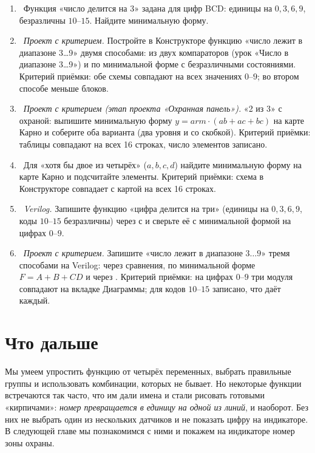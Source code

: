 \begin{taskbox}
\begin{enumerate}
  \item {}~Функция «число делится на 3» задана для цифр BCD: единицы на $0,3,6,9$, безразличны $10$--$15$. Найдите минимальную форму.
  \item {}~\emph{Проект с критерием.} Постройте в Конструкторе функцию «число лежит в диапазоне 3\ldots 9» двумя способами: из двух компараторов (урок «Число в диапазоне 3\ldots 9») и по минимальной форме с безразличными состояниями. Критерий приёмки: обе схемы совпадают на всех значениях $0$--$9$; во втором способе меньше блоков.
  \item {}~\emph{Проект с критерием (этап проекта «Охранная панель»).} «2 из 3» с охраной: выпишите минимальную форму $y=arm\cdot(ab+ac+bc)$ на карте Карно и соберите оба варианта (два уровня и со скобкой). Критерий приёмки: таблицы совпадают на всех 16 строках, число элементов записано.
  \item {}~Для «хотя бы двое из четырёх» ($a,b,c,d$) найдите минимальную форму на карте Карно и подсчитайте элементы. Критерий приёмки: схема в Конструкторе совпадает с картой на всех 16 строках.
  \item {}~\emph{Verilog.} Запишите функцию «цифра делится на три» (единицы на $0,3,6,9$, коды $10$--$15$ безразличны) через  с  и сверьте её с минимальной формой на цифрах $0$--$9$.
  \item {}~\emph{Проект с критерием.} Запишите «число лежит в диапазоне $3\ldots9$» тремя способами на Verilog: через сравнения, по минимальной форме $F=A+B+CD$ и через . Критерий приёмки: на цифрах $0$--$9$ три модуля совпадают на вкладке Диаграммы; для кодов $10$--$15$ записано, что даёт каждый.
\end{enumerate}
\end{taskbox}

\section{Что дальше}

Мы умеем упростить функцию от четырёх переменных, выбрать правильные группы
и использовать комбинации, которых не бывает. Но некоторые функции встречаются
так часто, что им дали имена и стали рисовать готовыми «кирпичами»:
\emph{номер превращается в единицу на одной из линий}, и наоборот. Без них
не выбрать один из нескольких датчиков и не показать цифру на индикаторе. В
следующей главе мы познакомимся с ними и покажем на индикаторе номер зоны
охраны.
